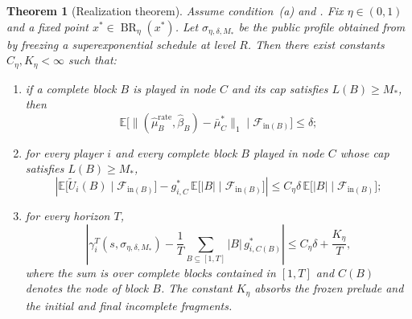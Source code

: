 \documentclass[12pt]{article}
\newtheorem{theorem}{Theorem}[section]
\theoremstyle{definition}
\newcommand{\E}{\mathbb{E}}
\newcommand{\1}{\mathbf{1}}
\newcommand{\cF}{\mathcal{F}}
\DeclareMathOperator{\BR}{BR}
\begin{document}
\begin{theorem}[Realization theorem]
\label{thm:realization}
Assume condition~\textnormal{(a)} and . Fix
$\eta\in(0,1)$ and a fixed point $x^*\in\BR_\eta(x^*)$. Let
$\sigma_{\eta,\delta,M_*}$ be the public profile obtained from
 by freezing a superexponential schedule at level $R$.
Then there exist constants $C_\eta,K_\eta<\infty$ such that:
\begin{enumerate}[label=\textnormal{(Q\arabic*)},leftmargin=2.8em]
\item if a complete block $B$ is played in node $C$ and its cap satisfies
$L(B)\ge M_*$, then
\begin{equation}
\label{eq:block-occupation-realization}
\E\bigl[\|(\widehat\mu_B^{\mathrm{rate}},\widehat\beta_B)-\bar\mu_C^*\|_1
\mid \cF_{\mathrm{in}(B)}\bigr]
\le \delta;
\end{equation}
\item for every player $i$ and every complete block $B$ played in node $C$
whose cap satisfies $L(B)\ge M_*$,
\begin{equation}
\label{eq:block-payoff-realization}
\left|
\E\bigl[\widetilde U_i(B)\mid \cF_{\mathrm{in}(B)}\bigr]
-
g_{i,C}^*\,\E\bigl[|B|\mid \cF_{\mathrm{in}(B)}\bigr]
\right|
\le C_\eta\delta\,\E\bigl[|B|\mid \cF_{\mathrm{in}(B)}\bigr];
\end{equation}
\item for every horizon $T$,
\begin{equation}
\label{eq:realization-tail-bound}
\left|
\gamma_i^T(s,\sigma_{\eta,\delta,M_*})
-
\frac1T\sum_{B\subseteq [1,T]} |B|\,g_{i,C(B)}^*
\right|
\le C_\eta\delta + \frac{K_\eta}{T},
\end{equation}
where the sum is over complete blocks contained in $[1,T]$ and $C(B)$ denotes the
node of block $B$. The constant $K_\eta$ absorbs the frozen prelude and the
initial and final incomplete fragments.
\end{enumerate}
\end{theorem}
\end{document}
